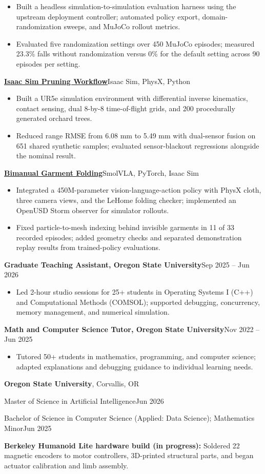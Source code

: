 \documentclass[letterpaper,10pt]{article}
\newcommand{\resumeSection}[1]{\par\vspace{7pt}{\large\bfseries #1}\par\vspace{3pt}}
\newcommand{\project}[3]{\par\vspace{3pt}\textbf{\href{#2}{#1}}\enspace\textbar\enspace #3\par}
\newcommand{\resumeItem}[1]{\item #1}
\begin{document}
\begin{itemize}
\resumeItem{Built a headless simulation-to-simulation evaluation harness using the upstream deployment controller; automated policy export, domain-randomization sweeps, and MuJoCo rollout metrics.}
\resumeItem{Evaluated five randomization settings over 450 MuJoCo episodes; measured 23.3\% falls without randomization versus 0\% for the default setting across 90 episodes per setting.}
\end{itemize}
\project{Isaac Sim Pruning Workflow}{https://github.com/joses2017smjh/isaac-sim-pruning-workflow}{Isaac Sim, PhysX, Python}
\begin{itemize}
\resumeItem{Built a UR5e simulation environment with differential inverse kinematics, contact sensing, dual 8-by-8 time-of-flight grids, and 200 procedurally generated orchard trees.}
\resumeItem{Reduced range RMSE from 6.08 mm to 5.49 mm with dual-sensor fusion on 651 shared synthetic samples; evaluated sensor-blackout regressions alongside the nominal result.}
\end{itemize}
\project{Bimanual Garment Folding}{https://github.com/joses2017smjh/IsaacSimFolding}{SmolVLA, PyTorch, Isaac Sim}
\begin{itemize}
\resumeItem{Integrated a 450M-parameter vision-language-action policy with PhysX cloth, three camera views, and the LeHome folding checker; implemented an OpenUSD Storm observer for simulator rollouts.}
\resumeItem{Fixed particle-to-mesh indexing behind invisible garments in 11 of 33 recorded episodes; added geometry checks and separated demonstration replay results from trained-policy evaluations.}
\end{itemize}
\resumeSection{Experience}
\textbf{Graduate Teaching Assistant, Oregon State University}\enspace\textbar\enspace Sep 2025 -- Jun 2026\par
\begin{itemize}
\resumeItem{Led 2-hour studio sessions for 25+ students in Operating Systems I (C++) and Computational Methods (COMSOL); supported debugging, concurrency, memory management, and numerical simulation.}
\end{itemize}
\textbf{Math and Computer Science Tutor, Oregon State University}\enspace\textbar\enspace Nov 2022 -- Jun 2025\par
\begin{itemize}
\resumeItem{Tutored 50+ students in mathematics, programming, and computer science; adapted explanations and debugging guidance to individual learning needs.}
\end{itemize}
\resumeSection{Education}
\textbf{Oregon State University}, Corvallis, OR\par
Master of Science in Artificial Intelligence\enspace\textbar\enspace Jun 2026\par
Bachelor of Science in Computer Science (Applied: Data Science); Mathematics Minor\enspace\textbar\enspace Jun 2025\par
\resumeSection{Additional Experience}
\textbf{Berkeley Humanoid Lite hardware build (in progress):} Soldered 22 magnetic encoders to motor controllers, 3D-printed structural parts, and began actuator calibration and limb assembly.
\end{document}
